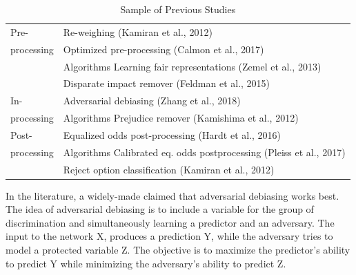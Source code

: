  \begin{table}[!t]
\footnotesize
 \begin{center}
\begin{tabular}{|p{1in}|p{5in}|}\hline
    \rowcolor{gray!20}Pre-  & Re-weighing (Kamiran et al., 2012) \cite{kamiran2012data} \\
    \rowcolor{gray!20} processing& Optimized pre-processing (Calmon et al., 2017) \cite{NIPS2017_6988} \\
   \rowcolor{gray!20}  & Algorithms Learning fair representations (Zemel et al., 2013) \cite{pmlr-v28-zemel13}\\
    \rowcolor{gray!20} & Disparate impact remover (Feldman et al., 2015) \cite{Feldman:2015:CRD:2783258.2783311}\\
    \hline
   In-     & Adversarial debiasing (Zhang et al., 2018) \cite{Zhang:2018:MUB:3278721.3278779}\\
    processing& Algorithms Prejudice remover (Kamishima et al., 2012) \cite{Kamishima}\\
    \hline
   \rowcolor{gray!20}  Post-   & Equalized odds post-processing (Hardt et al., 2016) \cite{hardt2016equality}\\
    \rowcolor{gray!20}processing & Algorithms Calibrated eq. odds postprocessing (Pleiss et al., 2017) \cite{NIPS2017_7151}\\
   \rowcolor{gray!20}  & Reject option classification (Kamiran et al., 2012) \cite{Kamiran:2018:ERO:3165328.3165686}\\\hline
   
\end{tabular}
\end{center} 
\caption{Sample of Previous Studies}
\label{tbl:multicol}
\end{table} 

 
  In the literature, a widely-made   claimed that
adversarial 
debiasing works best\cite{Zhang:2018:MUB:3278721.3278779}. The idea of adversarial debiasing is to include a variable for the group of discrimination and simultaneously learning a predictor
and an adversary. The input to the network X, produces a prediction Y, while the adversary tries to model a protected variable Z. The objective is to maximize the predictor's ability to predict Y while minimizing the adversary's ability to predict Z. 



